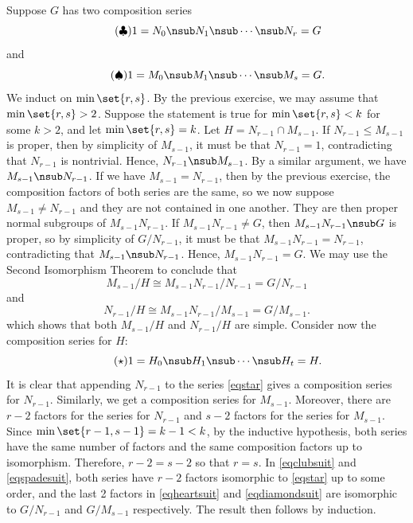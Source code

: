 \begin{sol}
    Suppose $G$ has two composition series
    \begin{equation}
        \label{eqclubsuit}
        \tag{$\clubsuit$}
        1 = N_0 \nsub N_1 \nsub \cdots \nsub N_r = G
    \end{equation}
    and
    \begin{equation}
        \label{eqspadesuit}
        \tag{$\spadesuit$}
        1 = M_0 \nsub M_1 \nsub \cdots \nsub M_s = G.
    \end{equation}
    We induct on $\min\set{r,s}$.
	By the previous exercise, we may assume that $\min\set{r, s} > 2$.
	Suppose the statement is true for $\min\set{r, s} < k$ for some $k > 2$, and let $\min\set{r, s} = k$.
	Let $H = N_{r - 1} \cap M_{s - 1}$.
	If $N_{r - 1} \leq M_{s - 1}$ is proper, then by simplicity of $M_{s - 1}$, it must be that $N_{r - 1} = 1$, contradicting that $N_{r - 1}$ is nontrivial.
	Hence, $N_{r - 1} \nsub M_{s - 1}$.
	By a similar argument, we have $M_{s - 1} \nsub N_{r - 1}$.
	If we have $M_{s - 1} = N_{r - 1}$, then by the previous exercise, the composition factors of both series are the same, so we now suppose $M_{s - 1} \neq N_{r - 1}$ and they are not contained 
    in one another.
	They are then proper normal subgroups of $M_{s - 1}N_{r - 1}$.
	If $M_{s - 1}N_{r - 1} \neq G$, then $M_{s - 1}N_{r - 1} \nsub G$ is proper, so by simplicity of $G/N_{r - 1}$, it must be that $M_{s - 1}N_{r - 1} = N_{r - 1}$, contradicting that $M_{s - 1} \nsub N_{r - 1}$.
	Hence, $M_{s - 1}N_{r - 1} = G$.
	We may use the Second Isomorphism Theorem to conclude that
    \begin{equation}
        \label{eqheartsuit}
        \tag{$\heartsuit$}
        M_{s - 1}/H \cong M_{s - 1}N_{r - 1}/N_{r - 1} = G/N_{r - 1}
    \end{equation}
    and
    \begin{equation}
        \label{eqdiamondsuit}
        \tag{$\diamondsuit$}
        N_{r - 1}/H \cong M_{s - 1}N_{r - 1}/M_{s - 1} = G/M_{s - 1}.
    \end{equation}
    which shows that both $M_{s - 1}/H$ and $N_{r - 1}/H$ are simple.
	Consider now the composition series for $H$:
    \begin{equation}
        \label{eqstar}
        \tag{$\star$}
        1 = H_0 \nsub H_1 \nsub \cdots \nsub H_t = H.
    \end{equation}
    It is clear that appending $N_{r - 1}$ to the series \eqref{eqstar} gives a composition series for $N_{r - 1}$.
	Similarly, we get a composition series for $M_{s - 1}$.
	Moreover, there are $r - 2$ factors for the series for $N_{r - 1}$ and $s - 2$ factors for the series for $M_{s - 1}$.
	Since $\min\set{r - 1, s - 1} = k - 1 < k$, by the inductive hypothesis, both series have the same number of factors and the same composition factors up to isomorphism.
	Therefore, $r - 2 = s - 2$ so that $r = s$.
	In \eqref{eqclubsuit} and \eqref{eqspadesuit}, both series have $r - 2$ factors isomorphic to \eqref{eqstar} up to some order, and the last 2 factors in \eqref{eqheartsuit} and \eqref{eqdiamondsuit} are isomorphic to $G/N_{r - 1}$ and $G/M_{s - 1}$ respectively.
	The result then follows by induction.
\end{sol}

